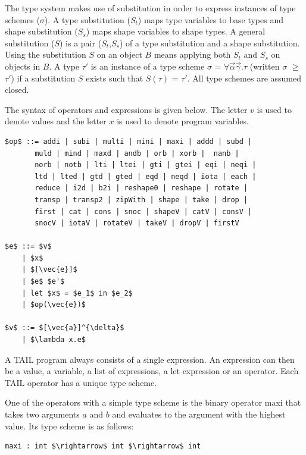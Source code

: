 \documentclass[11pt]{article}
\begin{document}
The type system makes use of substitution in order to express instances of type schemes ($\sigma$).
A type substitution ($S_t$) maps type variables to base types and shape substitution ($S_s$) maps shape variables to shape types.
A general substitution ($S$) is a pair ($S_t$,$S_s$) of a type substitution and a shape substitution.
Using the substitution $S$ on an object $B$ means applying both $S_t$ and $S_s$ on objects in $B$.
A type $\tau'$ is an instance of a type scheme $\sigma$ = $\forall\vec{\alpha}\vec{\gamma}$.$\tau$ (written $\sigma$ $\geq$ $\tau'$) if a substitution $S$ exists such that $S(\tau)$ = $\tau'$. All type schemes are assumed closed.

The syntax of operators and expressions is given below. The letter $v$ is used to denote values and the letter $x$ is used to denote program variables. 
\begin{lstlisting}[numbers=none,frame=none]
$op$ ::= addi | subi | multi | mini | maxi | addd | subd | 
       muld | mind | maxd | andb | orb | xorb |  nanb | 
       norb | notb | lti | ltei | gti | gtei | eqi | neqi |
       ltd | lted | gtd | gted | eqd | neqd | iota | each |
       reduce | i2d | b2i | reshape0 | reshape | rotate |
       transp | transp2 | zipWith | shape | take | drop |
       first | cat | cons | snoc | shapeV | catV | consV | 
       snocV | iotaV | rotateV | takeV | dropV | firstV 

$e$ ::= $v$ 
    | $x$ 
    | $[\vec{e}]$ 
    | $e$ $e'$ 
    | let $x$ = $e_1$ in $e_2$ 
    | $op(\vec{e})$

$v$ ::= $[\vec{a}]^{\delta}$
    | $\lambda x.e$
\end{lstlisting}
A TAIL program always consists of a single expression. An expression can then be a value, a variable, 
a list of expressions, a let expression or an operator. Each TAIL operator has a unique type scheme.

One of the operators with a simple type scheme is the binary operator maxi that takes two arguments $a$ and $b$ and evaluates to the argument with the highest value. Its type scheme is as follows:
\begin{lstlisting}[numbers=none,frame=none]
maxi : int $\rightarrow$ int $\rightarrow$ int
\end{lstlisting}
\end{document}
